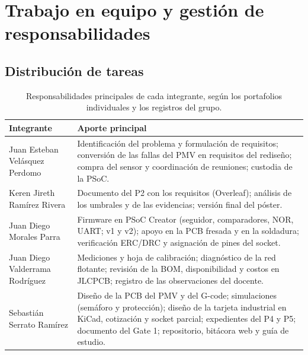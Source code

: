 \documentclass[11pt,a4paper]{article}
\begin{document}
\section{Trabajo en equipo y gestión de responsabilidades}\label{sec:equipo}
\subsection{Distribución de tareas}
\begin{table}[H]\centering\small
\caption{Responsabilidades principales de cada integrante, según los portafolios individuales y los registros del grupo.}
\begin{tabularx}{\linewidth}{>{\raggedright\arraybackslash}p{4.0cm}X}
\toprule
Integrante & Aporte principal \\
\midrule
Juan Esteban Velásquez Perdomo & Identificación del problema y formulación de requisitos; conversión de las fallas del PMV en requisitos del rediseño; compra del sensor y coordinación de reuniones; custodia de la PSoC. \\
Keren Jireth Ramírez Rivera & Documento del P2 con los requisitos (Overleaf); análisis de los umbrales y de las evidencias; versión final del póster. \\
Juan Diego Morales Parra & Firmware en PSoC Creator (seguidor, comparadores, NOR, UART; v1 y v2); apoyo en la PCB fresada y en la soldadura; verificación ERC/DRC y asignación de pines del socket. \\
Juan Diego Valderrama Rodríguez & Mediciones y hoja de calibración; diagnóstico de la red flotante; revisión de la BOM, disponibilidad y costos en JLCPCB; registro de las observaciones del docente. \\
Sebastián Serrato Ramírez & Diseño de la PCB del PMV y del G-code; simulaciones (semáforo y protección); diseño de la tarjeta industrial en KiCad, cotización y socket parcial; expedientes del P4 y P5; documento del Gate 1; repositorio, bitácora web y guía de estudio. \\
\bottomrule
\end{tabularx}
\end{table}
\end{document}
